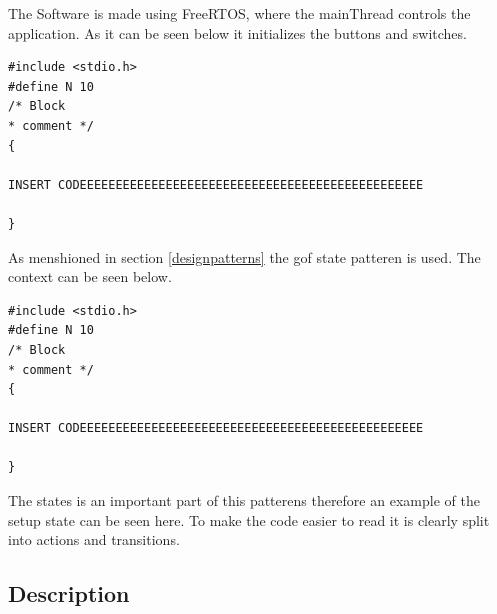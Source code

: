 The Software is made using FreeRTOS, where the mainThread controls the application. As it can be seen below it initializes the buttons and switches.

\begin{lstlisting}[style=customc++, label={lst:listingExample}, caption={Example listing.}]
#include <stdio.h>
#define N 10
/* Block
* comment */
{

INSERT CODEEEEEEEEEEEEEEEEEEEEEEEEEEEEEEEEEEEEEEEEEEEEEEEE

}
\end{lstlisting}

As menshioned in section \ref{designpatterns} the gof state patteren is used. The context can be seen below.
\begin{lstlisting}[style=customc++, label={lst:listingExample}, caption={Example listing.}]
#include <stdio.h>
#define N 10
/* Block
* comment */
{

INSERT CODEEEEEEEEEEEEEEEEEEEEEEEEEEEEEEEEEEEEEEEEEEEEEEEE

}
\end{lstlisting}

The states is an important part of this patterens therefore an example of the setup state can be seen here. To make the code easier to read it is clearly split into actions and transitions. 


\subsection{Description}

\noindent{}